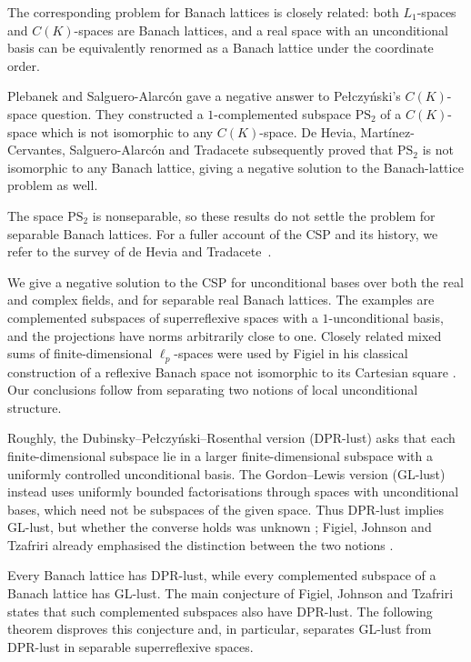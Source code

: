 \documentclass[11pt,a4paper,reqno]{amsart}
\theoremstyle{definition}
\numberwithin{equation}{section}
\begin{document}
The corresponding problem for Banach lattices is closely related: both $L_1$-spaces and $C(K)$-spaces are Banach lattices, and a real space with an unconditional basis can be equivalently renormed as a Banach lattice under the coordinate order.

Plebanek and Salguero-Alarc\'on \cite{PlebanekSalguero2023} gave a negative answer to Pe\l czy\'nski's $C(K)$-space question. They constructed a $1$-complemented subspace $\mathrm{PS}_2$ of a $C(K)$-space which is not isomorphic to any $C(K)$-space. De Hevia, Mart\'inez-Cervantes, Salguero-Alarc\'on and Tradacete \cite{DeHeviaEtAl2025} subsequently proved that $\mathrm{PS}_2$ is not isomorphic to any Banach lattice, giving a negative solution to the Banach-lattice problem as well.

The space $\mathrm{PS}_2$ is nonseparable, so these results do not settle the problem for separable Banach lattices. For a fuller account of the CSP and its history, we refer to the survey of de Hevia and Tradacete~\cite{DeHeviaTradacete2025}.

We give a negative solution to the CSP for unconditional bases over both the real and complex fields, and for separable real Banach lattices. The examples are complemented subspaces of superreflexive spaces with a $1$-unconditional basis, and the projections have norms arbitrarily close to one. Closely related mixed sums of finite-dimensional $\ell_p$-spaces were used by Figiel in his classical construction of a reflexive Banach space not isomorphic to its Cartesian square \cite{Figiel1972}. Our conclusions follow from separating two notions of local unconditional structure.

Roughly, the Dubinsky--Pe\l czy\'nski--Rosenthal version (DPR-lust) \cite{DubinskyPelczynskiRosenthal1972} asks that each finite-dimensional subspace lie in a larger finite-dimensional subspace with a uniformly controlled unconditional basis. The Gordon--Lewis version (GL-lust) \cite{GordonLewis1974} instead uses uniformly bounded factorisations through spaces with unconditional bases, which need not be subspaces of the given space. Thus DPR-lust implies GL-lust, but whether the converse holds was unknown \cite{DeHeviaTradacete2025}; Figiel, Johnson and Tzafriri already emphasised the distinction between the two notions \cite[Remark~2.3]{FigielJohnsonTzafriri1975}.

Every Banach lattice has DPR-lust, while every complemented subspace of a Banach lattice has GL-lust. The main conjecture of Figiel, Johnson and Tzafriri \cite[p.~396]{FigielJohnsonTzafriri1975} states that such complemented subspaces also have DPR-lust. The following theorem disproves this conjecture and, in particular, separates GL-lust from DPR-lust in separable superreflexive spaces.
\end{document}
